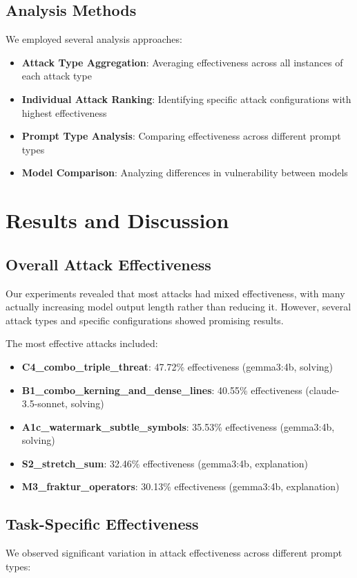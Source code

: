 \documentclass[conference]{IEEEtran}
\begin{document}
\begin{enumerate}
\subsection{Analysis Methods}
We employed several analysis approaches:
\begin{itemize}
    \item \textbf{Attack Type Aggregation}: Averaging effectiveness across all instances of each attack type
    \item \textbf{Individual Attack Ranking}: Identifying specific attack configurations with highest effectiveness
    \item \textbf{Prompt Type Analysis}: Comparing effectiveness across different prompt types
    \item \textbf{Model Comparison}: Analyzing differences in vulnerability between models
\end{itemize}

\section{Results and Discussion}
\subsection{Overall Attack Effectiveness}
Our experiments revealed that most attacks had mixed effectiveness, with many actually increasing model output length rather than reducing it. However, several attack types and specific configurations showed promising results.

The most effective attacks included:
\begin{itemize}
    \item \textbf{C4\_combo\_triple\_threat}: 47.72\% effectiveness (gemma3:4b, solving)
    \item \textbf{B1\_combo\_kerning\_and\_dense\_lines}: 40.55\% effectiveness (claude-3.5-sonnet, solving)
    \item \textbf{A1c\_watermark\_subtle\_symbols}: 35.53\% effectiveness (gemma3:4b, solving)
    \item \textbf{S2\_stretch\_sum}: 32.46\% effectiveness (gemma3:4b, explanation)
    \item \textbf{M3\_fraktur\_operators}: 30.13\% effectiveness (gemma3:4b, explanation)
\end{itemize}

\subsection{Task-Specific Effectiveness}
We observed significant variation in attack effectiveness across different prompt types:


\end{enumerate}
\end{document}
